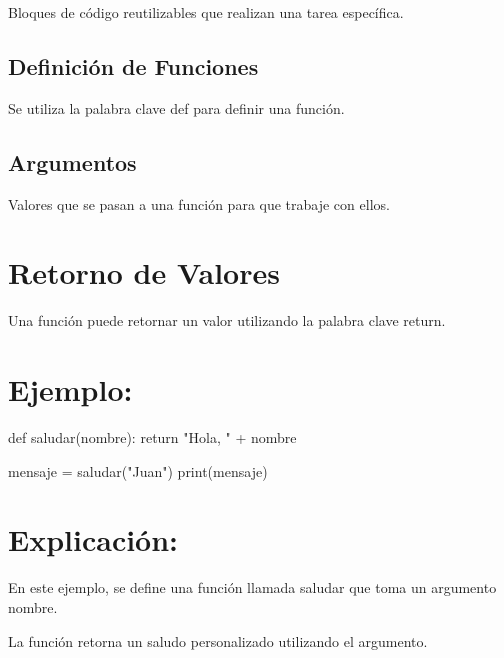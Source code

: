 \documentclass[
  a4paper,
  onepage,
  openany]{scrreprt}
\newenvironment{Shaded}{\begin{snugshade}}{\end{snugshade}}
\newcommand{\BuiltInTok}[1]{\textcolor[rgb]{0.00,0.23,0.31}{#1}}
\newcommand{\ControlFlowTok}[1]{\textcolor[rgb]{0.00,0.23,0.31}{#1}}
\newcommand{\KeywordTok}[1]{\textcolor[rgb]{0.00,0.23,0.31}{#1}}
\newcommand{\NormalTok}[1]{\textcolor[rgb]{0.00,0.23,0.31}{#1}}
\newcommand{\OperatorTok}[1]{\textcolor[rgb]{0.37,0.37,0.37}{#1}}
\newcommand{\StringTok}[1]{\textcolor[rgb]{0.13,0.47,0.30}{#1}}
\begin{document}
Bloques de código reutilizables que realizan una tarea específica.

\hypertarget{definiciuxf3n-de-funciones}{%
\subsection{Definición de Funciones}\label{definiciuxf3n-de-funciones}}

Se utiliza la palabra clave def para definir una función.

\hypertarget{argumentos}{%
\subsection{Argumentos}\label{argumentos}}

Valores que se pasan a una función para que trabaje con ellos.

\hypertarget{retorno-de-valores}{%
\section{Retorno de Valores}\label{retorno-de-valores}}

Una función puede retornar un valor utilizando la palabra clave return.

\hypertarget{ejemplo-44}{%
\section{Ejemplo:}\label{ejemplo-44}}

\begin{Shaded}
\begin{Highlighting}[]
\KeywordTok{def}\NormalTok{ saludar(nombre):}
    \ControlFlowTok{return} \StringTok{"Hola, "} \OperatorTok{+}\NormalTok{ nombre}

\NormalTok{mensaje }\OperatorTok{=}\NormalTok{ saludar(}\StringTok{"Juan"}\NormalTok{)}
\BuiltInTok{print}\NormalTok{(mensaje)}
\end{Highlighting}
\end{Shaded}

\hypertarget{explicaciuxf3n-44}{%
\section{Explicación:}\label{explicaciuxf3n-44}}

En este ejemplo, se define una función llamada saludar que toma un
argumento nombre.

La función retorna un saludo personalizado utilizando el argumento.
\end{document}
